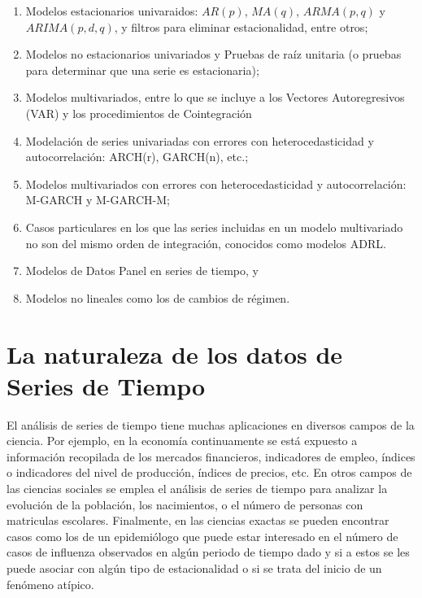 \documentclass[
]{book}
\begin{document}
\begin{enumerate}
\def\labelenumi{\arabic{enumi}.}
\item
  Modelos estacionarios univaraidos: \(AR(p)\), \(MA(q)\), \(ARMA(p, q)\) y \(ARIMA(p, d, q)\), y filtros para eliminar estacionalidad, entre otros;
\item
  Modelos no estacionarios univariados y Pruebas de raíz unitaria (o pruebas para determinar que una serie es estacionaria);
\item
  Modelos multivariados, entre lo que se incluye a los Vectores Autoregresivos (VAR) y los procedimientos de Cointegración
\item
  Modelación de series univariadas con errores con heterocedasticidad y autocorrelación: ARCH(r), GARCH(n), etc.;
\item
  Modelos multivariados con errores con heterocedasticidad y autocorrelación: M-GARCH y M-GARCH-M;
\item
  Casos particulares en los que las series incluidas en un modelo multivariado no son del mismo orden de integración, conocidos como modelos ADRL.
\item
  Modelos de Datos Panel en series de tiempo, y
\item
  Modelos no lineales como los de cambios de régimen.
\end{enumerate}

\hypertarget{la-naturaleza-de-los-datos-de-series-de-tiempo}{%
\section{La naturaleza de los datos de Series de Tiempo}\label{la-naturaleza-de-los-datos-de-series-de-tiempo}}

El análisis de series de tiempo tiene muchas aplicaciones en diversos campos de la ciencia. Por ejemplo, en la economía continuamente se está expuesto a información recopilada de los mercados financieros, indicadores de empleo, índices o indicadores del nivel de producción, índices de precios, etc. En otros campos de las ciencias sociales se emplea el análisis de series de tiempo para analizar la evolución de la población, los nacimientos, o el número de personas con matriculas escolares. Finalmente, en las ciencias exactas se pueden encontrar casos como los de un epidemiólogo que puede estar interesado en el número de casos de influenza observados en algún periodo de tiempo dado y si a estos se les puede asociar con algún tipo de estacionalidad o si se trata del inicio de un fenómeno atípico.
\end{document}
